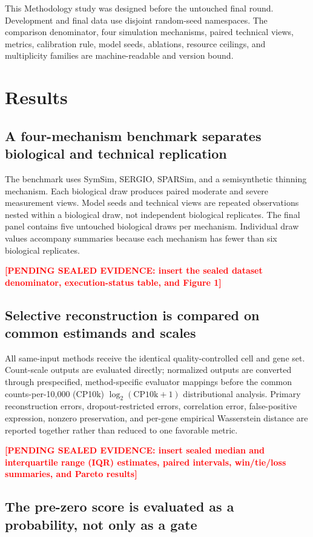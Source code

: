 \documentclass[pdflatex,sn-vancouver-num,referee,lineno]{sn-jnl}
\newcommand{\PendingResult}[1]{\textcolor{red}{\textbf{[PENDING SEALED EVIDENCE: #1]}}}
\begin{document}
This Methodology study was designed before the untouched final round. Development and final data use disjoint random-seed namespaces. The comparison denominator, four simulation mechanisms, paired technical views, metrics, calibration rule, model seeds, ablations, resource ceilings, and multiplicity families are machine-readable and version bound.

\section{Results}

\subsection{A four-mechanism benchmark separates biological and technical replication}

The benchmark uses SymSim, SERGIO, SPARSim, and a semisynthetic thinning mechanism. Each biological draw produces paired moderate and severe measurement views. Model seeds and technical views are repeated observations nested within a biological draw, not independent biological replicates. The final panel contains five untouched biological draws per mechanism. Individual draw values accompany summaries because each mechanism has fewer than six biological replicates.

\PendingResult{insert the sealed dataset denominator, execution-status table, and Figure 1}

\subsection{Selective reconstruction is compared on common estimands and scales}

All same-input methods receive the identical quality-controlled cell and gene set. Count-scale outputs are evaluated directly; normalized outputs are converted through prespecified, method-specific evaluator mappings before the common counts-per-10,000 (CP10k) $\log_2(\mathrm{CP10k}+1)$ distributional analysis. Primary reconstruction errors, dropout-restricted errors, correlation error, false-positive expression, nonzero preservation, and per-gene empirical Wasserstein distance are reported together rather than reduced to one favorable metric.

\PendingResult{insert sealed median and interquartile range (IQR) estimates, paired intervals, win/tie/loss summaries, and Pareto results}

\subsection{The pre-zero score is evaluated as a probability, not only as a gate}
\end{document}
